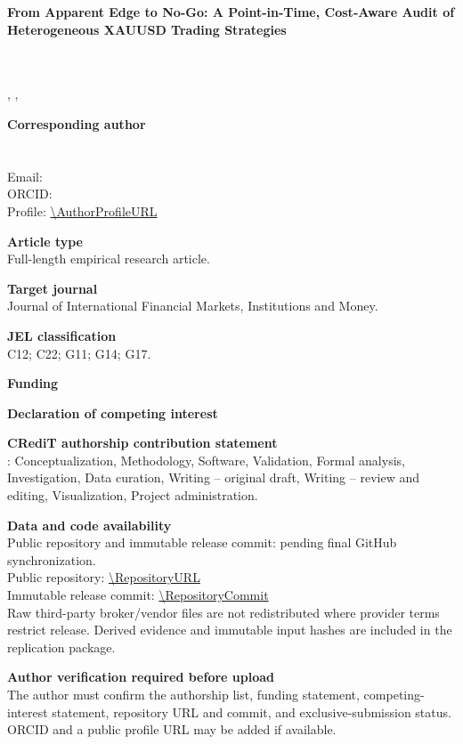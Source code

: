 \documentclass[11pt,a4paper]{article}
\begin{document}
\thispagestyle{empty}
\begin{center}
{\Large\bfseries From Apparent Edge to No-Go: A Point-in-Time, Cost-Aware Audit of Heterogeneous XAUUSD Trading Strategies\par}
\vspace{1.5cm}
{\large \AuthorName\par}
{\normalsize \AuthorTitle\par}
\vspace{0.4cm}
\AffiliationOrganization\\
\AffiliationAddress\\
\AffiliationCity, \AffiliationPostcode, \AffiliationCountry
\end{center}

\vspace{1cm}
\textbf{Corresponding author}\\
\AuthorName\\
\AuthorTitle\\
Email: \AuthorEmail\\
\if\relax\detokenize\expandafter{\AuthorORCID}\relax\else ORCID: \AuthorORCID\\\fi
\if\relax\detokenize\expandafter{\AuthorProfileURL}\relax\else Profile: \expandafter\url\expandafter{\AuthorProfileURL}\fi

\textbf{Article type}\\
Full-length empirical research article.

\textbf{Target journal}\\
Journal of International Financial Markets, Institutions and Money.

\textbf{JEL classification}\\
C12; C22; G11; G14; G17.

\textbf{Funding}\\
\FundingStatement

\textbf{Declaration of competing interest}\\
\InterestStatement

\textbf{CRediT authorship contribution statement}\\
\AuthorName: Conceptualization, Methodology, Software, Validation, Formal analysis, Investigation, Data curation, Writing -- original draft, Writing -- review and editing, Visualization, Project administration.

\textbf{Data and code availability}\\
\if\relax\detokenize\expandafter{\RepositoryURL}\relax
Public repository and immutable release commit: pending final GitHub synchronization.\\
\else
Public repository: \expandafter\url\expandafter{\RepositoryURL}\\
Immutable release commit: \expandafter\url\expandafter{\RepositoryCommit}\\
\fi
Raw third-party broker/vendor files are not redistributed where provider terms restrict release. Derived evidence and immutable input hashes are included in the replication package.

\textbf{Author verification required before upload}\\
The author must confirm the authorship list, funding statement, competing-interest statement, repository URL and commit, and exclusive-submission status. ORCID and a public profile URL may be added if available.
\end{document}
